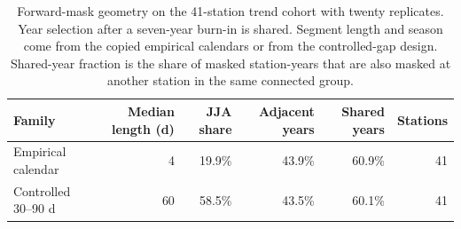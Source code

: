 \begin{table}[t]\centering\small
\caption{Forward-mask geometry on the 41-station trend cohort with twenty replicates. Year selection after a seven-year burn-in is shared. Segment length and season come from the copied empirical calendars or from the controlled-gap design. Shared-year fraction is the share of masked station-years that are also masked at another station in the same connected group.}
\label{tab:gap-geometry}
\begin{tabular}{lrrrrr}
\toprule
Family & Median length (d) & JJA share & Adjacent years & Shared years & Stations \\
\midrule
Empirical calendar & 4 & 19.9\% & 43.9\% & 60.9\% & 41 \\
Controlled 30--90 d & 60 & 58.5\% & 43.5\% & 60.1\% & 41 \\
\bottomrule\end{tabular}
\end{table}
